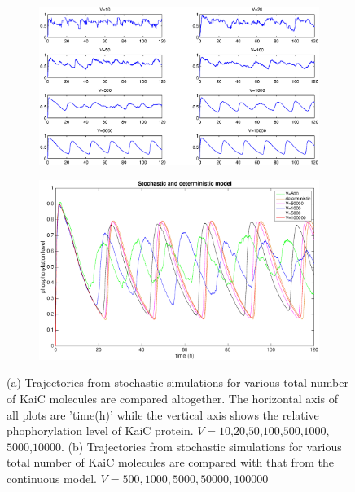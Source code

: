 \documentclass[a4paper,10pt]{article}
\numberwithin{equation}{section}
\begin{document}
\begin{figure}
\centering
\begin{subfigure}{0.8\textwidth}
\centering
\includegraphics[scale=0.5]{vfrom10to10000.eps}
\caption{}\label{fig:Vfrom10to10000}
\end{subfigure}
\quad
\begin{subfigure}{0.8\textwidth}
\centering
\includegraphics[scale=0.3]{stochastic_deterministic_3_7.eps}
\caption{}\label{fig:conVSdisc}
\end{subfigure}
\caption{\selectfont (a)  Trajectories from stochastic simulations for various total number of KaiC molecules  are compared altogether. The horizontal axis of all plots are 'time(h)' while the vertical axis shows the  relative phophorylation level of KaiC protein.  $V=10$,$20$,$50$,$100$,$500$,$1000$,$5000$,$10000$. (b) Trajectories from stochastic simulations for various total number of KaiC molecules are compared with that from the continuous model. $V=500,1000,5000,50000,100000$}
\end{figure}
\end{document}
